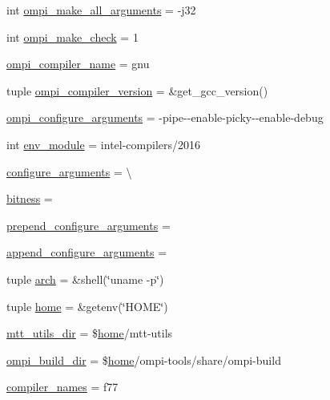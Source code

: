 \begin{DoxyCompactItemize}
\item 
int \hyperlink{namespaceompi-core-template_a8cfb168e266191b0299e13db0e040acf}{ompi\-\_\-make\-\_\-all\-\_\-arguments} = -\/j32
\item 
int \hyperlink{namespaceompi-core-template_a22a1627fa5b27a6349a7d4804e9baaca}{ompi\-\_\-make\-\_\-check} = 1
\item 
\hyperlink{namespaceompi-core-template_ade0d9e9efc683bbbb68edd34d616526f}{ompi\-\_\-compiler\-\_\-name} = gnu
\item 
tuple \hyperlink{namespaceompi-core-template_a995fd0de0a7e064a6959e6ba7e59a525}{ompi\-\_\-compiler\-\_\-version} = \&get\-\_\-gcc\-\_\-version()
\item 
\hyperlink{namespaceompi-core-template_a3617cfaebbf09bd156bb6f00d4584019}{ompi\-\_\-configure\-\_\-arguments} = -\/pipe-\/-\/enable-\/picky-\/-\/enable-\/debug
\item 
int \hyperlink{namespaceompi-core-template_a3bf425cb265062b8fec8a62d2a1fd8a3}{env\-\_\-module} = intel-\/compilers/2016
\item 
\hyperlink{namespaceompi-core-template_aa36e733a811f66e0670e3e5359fa87c0}{configure\-\_\-arguments} = \textbackslash{}
\item 
\hyperlink{namespaceompi-core-template_a33886dd20e2ff716e34eaa7ef4ca4af2}{bitness} =
\item 
\hyperlink{namespaceompi-core-template_a9f5830661ad9df1c27b678278222d554}{prepend\-\_\-configure\-\_\-arguments} =
\item 
\hyperlink{namespaceompi-core-template_ad3863a095d671688912d3297baf0f161}{append\-\_\-configure\-\_\-arguments} =
\item 
tuple \hyperlink{namespaceompi-core-template_a710dd59a52ca88aad0a440a9d78a386c}{arch} = \&shell(\char`\"{}uname -\/p\char`\"{})
\item 
tuple \hyperlink{namespaceompi-core-template_ae80397dcb3454ac02e396f9faec83f92}{home} = \&getenv(\char`\"{}H\-O\-M\-E\char`\"{})
\item 
\hyperlink{namespaceompi-core-template_ae338b0b9d4bd23546207d4ce98454696}{mtt\-\_\-utils\-\_\-dir} = \$\hyperlink{namespaceompi-core-template_ae80397dcb3454ac02e396f9faec83f92}{home}/mtt-\/utils
\item 
\hyperlink{namespaceompi-core-template_a16792dcf7471cfb9371e3866e5b29bda}{ompi\-\_\-build\-\_\-dir} = \$\hyperlink{namespaceompi-core-template_ae80397dcb3454ac02e396f9faec83f92}{home}/ompi-\/tools/share/ompi-\/build
\item 
\hyperlink{namespaceompi-core-template_ad9ac09e41f4ccb6262103f180cbfc0db}{compiler\-\_\-names} = f77

\end{DoxyCompactItemize}
